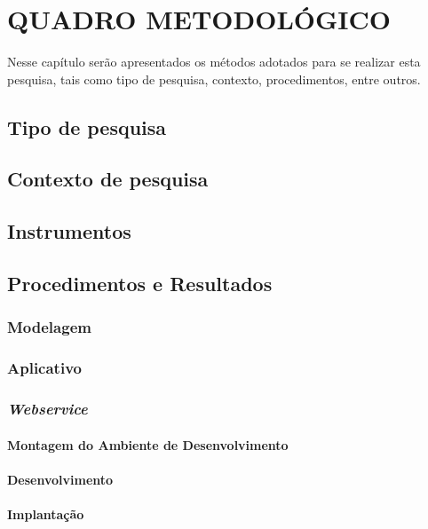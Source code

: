 \chapter{QUADRO METODOLÓGICO}

	\par Nesse capítulo serão apresentados os métodos adotados para se realizar esta
pesquisa, tais como tipo de pesquisa, contexto, procedimentos, entre outros.

	\section{Tipo de pesquisa}
		
	\section{Contexto de pesquisa}
		
	\section{Instrumentos}
		
	\section{Procedimentos e Resultados}
		
			\subsection{Modelagem}
				
			\subsection{Aplicativo}
				
			\subsection{\textit{Webservice}}	
				
						\subsubsection{Montagem do Ambiente de Desenvolvimento}
							
						\subsubsection{Desenvolvimento}
							
						\subsubsection{Implantação}	
							
